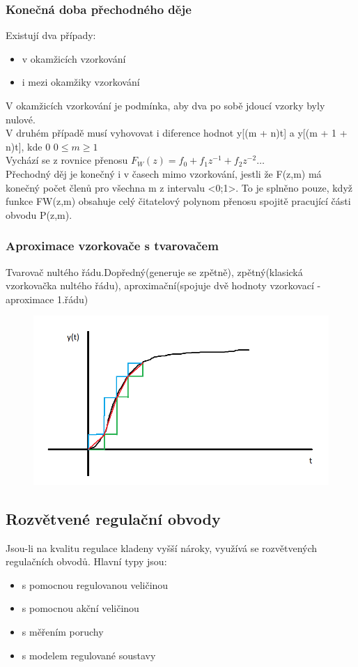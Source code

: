 \subsubsection*{Konečná doba přechodného děje}
Existují dva případy:
\begin{itemize}
    \item v okamžicích vzorkování
    \item i mezi okamžiky vzorkování
\end{itemize}
V okamžicích vzorkování je podmínka, aby dva po sobě jdoucí vzorky byly nulové.\\
V druhém případě musí vyhovovat i diference hodnot y[(m + n)t] a y[(m + 1 + n)t], kde 0 $0 \leq m \geq 1$\\
Vychází se z rovnice přenosu $F_W(z) = f_0 + f_1z^{-1}+f_2z^{-2} \dots $ \\
Přechodný děj je konečný i v časech mimo vzorkování, jestli že F(z,m) má konečný počet členů pro všechna m z intervalu <0;1>. To je splněno pouze, když funkce FW(z,m) obsahuje celý čitatelový polynom přenosu spojitě pracující části obvodu P(z,m).\\
\subsubsection*{Aproximace vzorkovače s tvarovačem}
Tvarovač nultého řádu.Dopředný(generuje se zpětně), zpětný(klasická vzorkovačka nultého řádu), aproximační(spojuje dvě hodnoty vzorkovací - aproximace 1.řádu)
\begin{figure}[H]
    \includegraphics*[scale = 1]{images/tvarovace.png}
\end{figure}

\subsection*{Rozvětvené regulační obvody}
Jsou-li na kvalitu regulace kladeny vyšší nároky, využívá se rozvětvených regulačních obvodů.
Hlavní typy jsou:
\begin{itemize}
    \item s pomocnou regulovanou veličinou
    \item s pomocnou akční veličinou
    \item s měřením poruchy
    \item s modelem regulované soustavy
\end{itemize}


